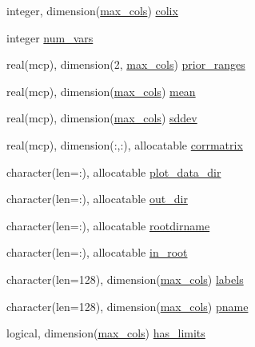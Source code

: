 \begin{DoxyCompactItemize}
\item 
integer, dimension(\mbox{\hyperlink{namespacemcsamples_ae8386bad918d8af8d203683c01d5818c}{max\+\_\+cols}}) \mbox{\hyperlink{namespacemcsamples_a16ed6273b18cc5caae328b4524db8061}{colix}}
\item 
integer \mbox{\hyperlink{namespacemcsamples_ad2594baa1bbb61af048a932e45cd4060}{num\+\_\+vars}}
\item 
real(mcp), dimension(2, \mbox{\hyperlink{namespacemcsamples_ae8386bad918d8af8d203683c01d5818c}{max\+\_\+cols}}) \mbox{\hyperlink{namespacemcsamples_a0902678bdbc7aa6ef8b8992ce0a19c5e}{prior\+\_\+ranges}}
\item 
real(mcp), dimension(\mbox{\hyperlink{namespacemcsamples_ae8386bad918d8af8d203683c01d5818c}{max\+\_\+cols}}) \mbox{\hyperlink{namespacemcsamples_a770892813dc80f66c4a9d4af5df91a26}{mean}}
\item 
real(mcp), dimension(\mbox{\hyperlink{namespacemcsamples_ae8386bad918d8af8d203683c01d5818c}{max\+\_\+cols}}) \mbox{\hyperlink{namespacemcsamples_aacce77bfdf0523e8c96285821ce2a3f4}{sddev}}
\item 
real(mcp), dimension(\+:,\+:), allocatable \mbox{\hyperlink{namespacemcsamples_a6f7e8571ffd569f3c7538169829a9612}{corrmatrix}}
\item 
character(len=\+:), allocatable \mbox{\hyperlink{namespacemcsamples_a77ab102d98a4253b3213f06db7371cf9}{plot\+\_\+data\+\_\+dir}}
\item 
character(len=\+:), allocatable \mbox{\hyperlink{namespacemcsamples_a12247a941c9940691d984cd9596796bd}{out\+\_\+dir}}
\item 
character(len=\+:), allocatable \mbox{\hyperlink{namespacemcsamples_a578b65f55aa7a0d9598291d1cbd550db}{rootdirname}}
\item 
character(len=\+:), allocatable \mbox{\hyperlink{namespacemcsamples_a0f43faad2c6f83998962006e04268623}{in\+\_\+root}}
\item 
character(len=128), dimension(\mbox{\hyperlink{namespacemcsamples_ae8386bad918d8af8d203683c01d5818c}{max\+\_\+cols}}) \mbox{\hyperlink{namespacemcsamples_abe3835988721f0cbcb6f7c28015e95f3}{labels}}
\item 
character(len=128), dimension(\mbox{\hyperlink{namespacemcsamples_ae8386bad918d8af8d203683c01d5818c}{max\+\_\+cols}}) \mbox{\hyperlink{namespacemcsamples_ae27c34b7ef99d6a3d92c13e419fcceb1}{pname}}
\item 
logical, dimension(\mbox{\hyperlink{namespacemcsamples_ae8386bad918d8af8d203683c01d5818c}{max\+\_\+cols}}) \mbox{\hyperlink{namespacemcsamples_ae802de51bb481b085361a661c090d461}{has\+\_\+limits}}

\end{DoxyCompactItemize}

